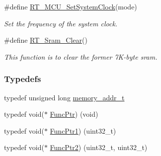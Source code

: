 \begin{DoxyCompactItemize}
\#define \mbox{\hyperlink{a00020_a017f8665ec51267680fc0e536db19c13}{R\+T\+\_\+\+M\+C\+U\+\_\+\+Set\+System\+Clock}}(mode)
\begin{DoxyCompactList}\small\item\em Set the frequency of the system clock. \end{DoxyCompactList}\item 
\#define \mbox{\hyperlink{a00020_ae64bbc76e9536602350b7ec801d010c1}{R\+T\+\_\+\+Sram\+\_\+\+Clear}}()
\begin{DoxyCompactList}\small\item\em This function is to clear the former 7\+K-\/byte sram. \end{DoxyCompactList}\end{DoxyCompactItemize}
\subsubsection*{Typedefs}
\begin{DoxyCompactItemize}
\item 
typedef unsigned long \mbox{\hyperlink{a00020_a06da901348542a481c297d9b700e2001}{memory\+\_\+addr\+\_\+t}}
\item 
typedef void($\ast$ \mbox{\hyperlink{a00020_a3d987633d7a3ca10c14905a807b62eb1}{Func\+Ptr}}) (void)
\item 
typedef void($\ast$ \mbox{\hyperlink{a00020_a0891965816a5b721b07f7bebefaf7430}{Func\+Ptr1}}) (uint32\+\_\+t)
\item 
typedef void($\ast$ \mbox{\hyperlink{a00020_a331a88eeefe11112bb8fe1b43dd777b8}{Func\+Ptr2}}) (uint32\+\_\+t, uint32\+\_\+t)
\end{DoxyCompactItemize}

